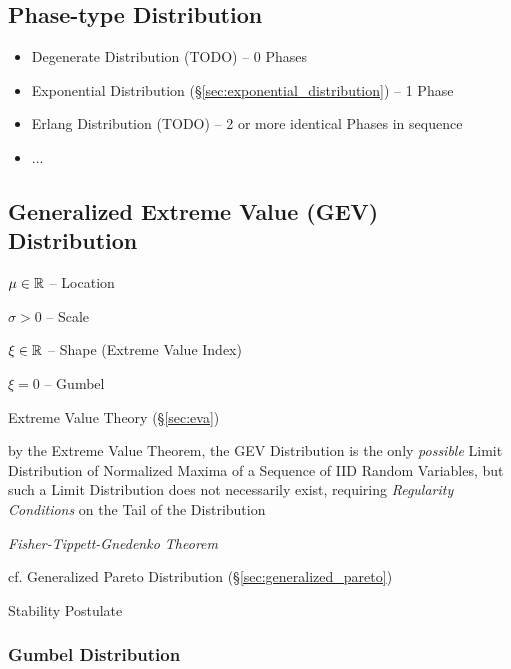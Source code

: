 \subsection{Phase-type Distribution}\label{sec:phasetype_distribution}

\begin{itemize}
  \item Degenerate Distribution (TODO) -- 0
    Phases
  \item Exponential Distribution (\S\ref{sec:exponential_distribution}) -- 1
    Phase
  \item Erlang Distribution (TODO) -- 2 or more identical Phases in sequence
  \item ...
\end{itemize}



\subsection{Generalized Extreme Value (GEV) Distribution}\label{sec:gev}

$\mu \in \mathbb{R}$ -- Location

$\sigma > 0$ -- Scale

$\xi \in \mathbb{R}$ -- Shape (Extreme Value Index)

$\xi = 0$ -- Gumbel

Extreme Value Theory (\S\ref{sec:eva})

by the Extreme Value Theorem, the GEV Distribution is the only \emph{possible}
Limit Distribution of Normalized Maxima of a Sequence of IID Random Variables,
but such a Limit Distribution does not necessarily exist, requiring
\emph{Regularity Conditions} on the Tail of the Distribution

\emph{Fisher-Tippett-Gnedenko Theorem}

cf. Generalized Pareto Distribution (\S\ref{sec:generalized_pareto})

Stability Postulate



\subsubsection{Gumbel Distribution}\label{sec:gumbel_distribution}

